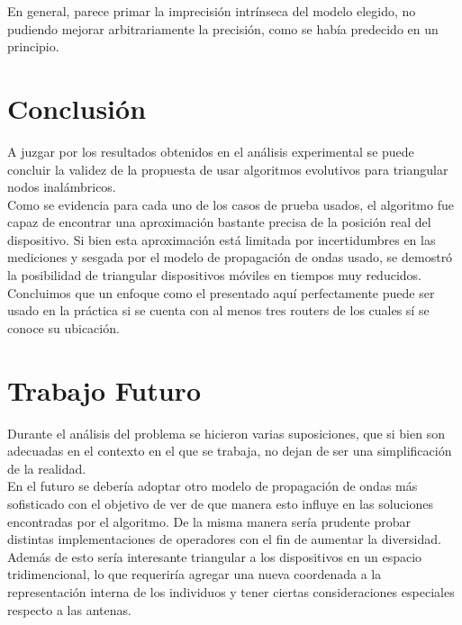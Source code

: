 \documentclass[journal]{IEEEtran}
\begin{document}
En general, parece primar la imprecisión intrínseca del modelo elegido, no pudiendo mejorar arbitrariamente la precisión, como se había predecido en un principio.\\

\section{Conclusión}

A juzgar por los resultados obtenidos en el análisis experimental se puede concluir la validez de la propuesta de usar algoritmos evolutivos para triangular nodos inalámbricos.\\

Como se evidencia para cada uno de los casos de prueba usados, el algoritmo fue capaz de encontrar una aproximación bastante precisa de la posición real del dispositivo. Si bien esta aproximación está limitada por incertidumbres en las mediciones y sesgada por el modelo de propagación de ondas usado, se demostró la posibilidad de triangular dispositivos móviles en tiempos muy reducidos.\\

Concluimos que un enfoque como el presentado aquí perfectamente puede ser usado en la práctica si se cuenta con al menos tres routers de los cuales sí se conoce su ubicación.\\

\section{Trabajo Futuro}

Durante el análisis del problema se hicieron varias suposiciones, que si bien son adecuadas en el contexto en el que se trabaja, no dejan de ser una simplificación de la realidad.\\

En el futuro se debería adoptar otro modelo de propagación de ondas más sofisticado con el objetivo de ver de que manera esto influye en las soluciones encontradas por el algoritmo. De la misma manera sería prudente probar distintas implementaciones de operadores con el fin de aumentar la diversidad.\\

Además de esto sería interesante triangular a los dispositivos en un espacio tridimencional, lo que requeriría agregar una nueva coordenada a la representación interna de los individuos y tener ciertas consideraciones especiales respecto a las antenas.\\
\end{document}
